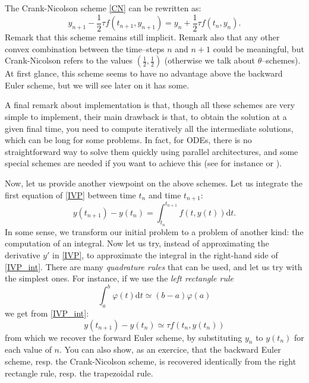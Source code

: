 \documentclass{article}
\begin{document}
The Crank-Nicolson scheme \eqref{CN} can be rewritten as:
\begin{equation} \label{CN2}
        y_{n+1} - \frac12 
        {\tau}f(t_{n+1},y_{n+1})
        = y_n + \frac12  {\tau}f(t_{n},y_{n}).
    \end{equation}
Remark that this scheme remains still implicit. Remark also that any other convex combination between the time--steps $n$ and $n+1$ could be meaningful, but Crank-Nicolson refers to the values $(\frac12,\frac12)$ (otherwise we talk about $\theta$--schemes).
At first glance, this scheme seems to have no advantage above the backward Euler scheme, but we will see later on it has some.


A final remark about implementation is that, though all these schemes are very simple to implement, their main drawback is that, to obtain the solution at a given final time, you need to compute iteratively all the intermediate solutions, which can be long for some problems. In fact, for ODEs, there is no straightforward way to solve them quickly using parallel architectures, and some special schemes are needed if you want to achieve this (see for instance 
\cite{gander15} or \cite{gander18}).


Now, let us provide another viewpoint on the above schemes. Let us integrate the first equation of \eqref{IVP} between time $t_n$ and time $t_{n+1}$:
\begin{equation} \label{IVP_int}
y(t_{n+1}) - y(t_n)
= \int_{t_n}^{t_{n+1}} f(t,y(t)) \mathrm{d}t.
\end{equation}
In some sense, we transform our initial problem to a problem of another kind: the computation of an integral. Now let us try, instead of approximating the derivative $y'$ in \eqref{IVP}, to approximate the integral in the right-hand side of \eqref{IVP_int}. There are many \emph{quadrature rules} that can be used, and let us try with the simplest ones. For instance, if we use the \emph{left rectangle rule}
\[
\int_a^b \varphi(t) \mathrm{d}t \simeq (b-a) \varphi(a)
\]
we get from \eqref{IVP_int}:
\begin{equation} \label{lEuler_int}
y(t_{n+1}) - y(t_n)
\simeq \tau f(t_n,y(t_n))
\end{equation}
from which we recover the forward Euler scheme, by substituting $y_n$ to $y(t_n)$ for each value of $n$. You can also show, as an exercice, that the backward Euler scheme, resp. the Crank-Nicolson scheme, is recovered identically from the right rectangle rule, resp. the trapezoidal rule.
\end{document}
